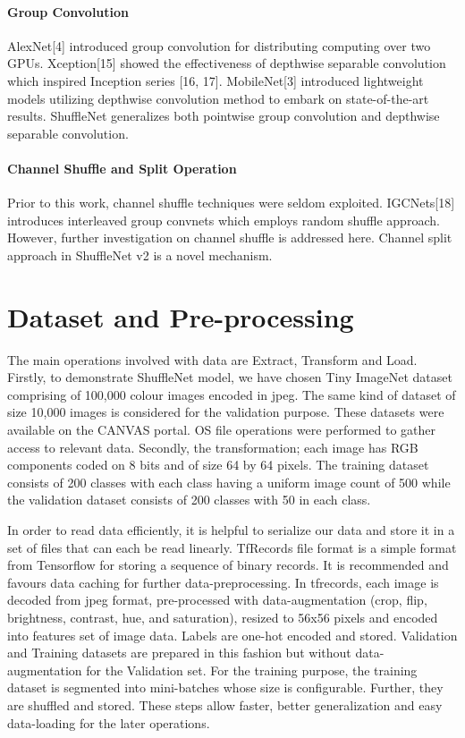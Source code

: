 \documentclass{article}
\begin{document}
\paragraph{Group Convolution} AlexNet[4] introduced group convolution for distributing computing over two GPUs. Xception[15] showed the effectiveness of depthwise separable convolution which inspired Inception series [16, 17].  MobileNet[3] introduced lightweight models utilizing depthwise convolution method to embark on state-of-the-art results. ShuffleNet generalizes both pointwise group convolution and depthwise separable convolution.

\paragraph{Channel Shuffle and Split Operation} 
Prior to this work, channel shuffle techniques were seldom exploited. IGCNets[18] introduces interleaved group convnets which employs random shuffle approach. However, further investigation on channel shuffle is addressed here. Channel split approach in ShuffleNet v2 is a novel mechanism.

\section{Dataset and Pre-processing}
The main operations involved with data are Extract, Transform and Load. Firstly, to demonstrate ShuffleNet model, we have chosen Tiny ImageNet dataset comprising of 100,000 colour images encoded in jpeg. The same kind of dataset of size 10,000 images is considered for the validation purpose. These datasets were available on the CANVAS portal. OS file operations were performed to gather access to relevant data. Secondly, the transformation; each image has RGB components coded on 8 bits and of size 64 by 64 pixels. The training dataset consists of 200 classes with each class having a uniform image count of 500 while the validation dataset consists of 200 classes with 50 in each class.

In order to read data efficiently, it is helpful to serialize our data and store it in a set of files that can each be read linearly. TfRecords file format is a simple format from Tensorflow for storing a sequence of binary records. It is recommended and favours data caching for further data-preprocessing. In tfrecords, each image is decoded from jpeg format, pre-processed with data-augmentation (crop, flip, brightness, contrast, hue, and saturation), resized to 56x56 pixels and encoded into features set of image data. Labels are one-hot encoded and stored. Validation and Training datasets are prepared in this fashion but without data-augmentation for the Validation set. For the training purpose, the training dataset is segmented into mini-batches whose size is configurable. Further, they are shuffled and stored. These steps allow faster, better generalization and easy data-loading for the later operations.
\end{document}
